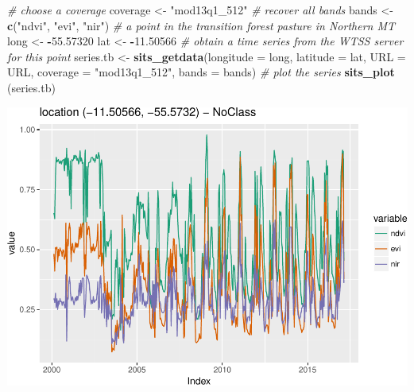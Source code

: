 \documentclass[11pt,]{article}
\newenvironment{Shaded}{\begin{snugshade}}{\end{snugshade}}
\newcommand{\KeywordTok}[1]{\textcolor[rgb]{0.13,0.29,0.53}{\textbf{#1}}}
\newcommand{\DataTypeTok}[1]{\textcolor[rgb]{0.13,0.29,0.53}{#1}}
\newcommand{\FloatTok}[1]{\textcolor[rgb]{0.00,0.00,0.81}{#1}}
\newcommand{\StringTok}[1]{\textcolor[rgb]{0.31,0.60,0.02}{#1}}
\newcommand{\CommentTok}[1]{\textcolor[rgb]{0.56,0.35,0.01}{\textit{#1}}}
\newcommand{\OperatorTok}[1]{\textcolor[rgb]{0.81,0.36,0.00}{\textbf{#1}}}
\newcommand{\NormalTok}[1]{#1}
\begin{document}
\begin{Shaded}
\begin{Highlighting}[]
\CommentTok{# choose a coverage}
\NormalTok{coverage <-}\StringTok{ "mod13q1_512"}
\CommentTok{# recover all bands}
\NormalTok{bands <-}\StringTok{ }\KeywordTok{c}\NormalTok{(}\StringTok{"ndvi"}\NormalTok{, }\StringTok{"evi"}\NormalTok{, }\StringTok{"nir"}\NormalTok{)}
\CommentTok{# a point in the transition forest pasture in Northern MT}
\NormalTok{long <-}\StringTok{ }\OperatorTok{-}\FloatTok{55.57320}
\NormalTok{lat <-}\StringTok{ }\OperatorTok{-}\FloatTok{11.50566}
\CommentTok{# obtain a time series from the WTSS server for this point}
\NormalTok{series.tb <-}\StringTok{ }\KeywordTok{sits_getdata}\NormalTok{(}\DataTypeTok{longitude =}\NormalTok{ long, }\DataTypeTok{latitude =}\NormalTok{ lat, }\DataTypeTok{URL =}\NormalTok{ URL, }\DataTypeTok{coverage =} \StringTok{"mod13q1_512"}\NormalTok{, }\DataTypeTok{bands =}\NormalTok{ bands)}
\CommentTok{# plot the series}
\KeywordTok{sits_plot}\NormalTok{ (series.tb)}
\end{Highlighting}
\end{Shaded}

\includegraphics{sits_description_files/figure-latex/unnamed-chunk-13-1.pdf}
\newpage
\singlespacing

\end{document}
